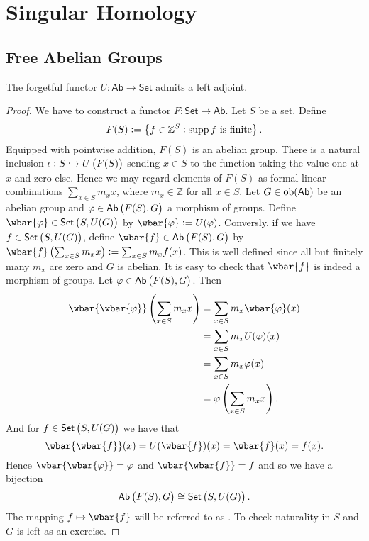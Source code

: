 \chapter{Singular Homology}
\section*{Free Abelian Groups}

\begin{proposition}
	The forgetful functor $U : \mathsf{Ab} \to \mathsf{Set}$ admits a left adjoint.
	\label{prop:free_adj_forget}
\end{proposition}

\begin{proof}
	We have to construct a functor $F : \mathsf{Set} \to \mathsf{Ab}$. Let $S$ be a set. Define 
	\begin{equation*}
		F(S) := \cbr[1]{f \in \mathbb{Z}^S : \supp f \text{ is finite}}.
	\end{equation*}
	Equipped with pointwise addition, $F(S)$ is an abelian group. There is a natural inclusion $\iota : S \hookrightarrow U\del[1]{F(S)}$ sending $x \in S$ to the function taking the value one at $x$ and zero else. Hence we may regard elements of $F(S)$ as formal linear combinations $\sum_{x \in S}m_x x$, where $m_x \in \mathbb{Z}$ for all $x \in S$. Let $G \in \operatorname{ob}(\mathsf{Ab})$ be an abelian group and $\varphi \in \mathsf{Ab}\del[1]{F(S), G}$ a morphism of groups. Define $\wbar{\varphi} \in \mathsf{Set}\del[1]{S,U(G)}$ by $\wbar{\varphi} := U(\varphi)$. Conversly, if we have $f \in \mathsf{Set}\del[1]{S,U(G)}$, define $\wbar{f} \in \mathsf{Ab}\del[1]{F(S),G}$ by $\wbar{f}\del[1]{\sum_{x \in S} m_x x} := \sum_{x \in S} m_x f(x)$. This is well defined since all but finitely many $m_x$ are zero and $G$ is abelian. It is easy to check that $\wbar{f}$ is indeed a morphism of groups. Let $\varphi \in \mathsf{Ab}\del[1]{F(S),G}$. Then
	\begin{align*}
		\wbar{\wbar{\varphi}}\del[4]{\sum_{x \in S} m_x x} &= \sum_{x \in S}m_x \wbar{\varphi}(x)\\
		&= \sum_{x \in S} m_x U(\varphi)(x)\\
		&= \sum_{x \in S} m_x \varphi(x)\\
		&= \varphi \del[4]{\sum_{x \in S} m_x x}.
	\end{align*}
	And for $f \in \mathsf{Set}\del[1]{S,U(G)}$ we have that
	\begin{equation*}
		\wbar{\wbar{f}}(x) = U(\wbar{f})(x) = \wbar{f}(x) = f(x). 
	\end{equation*}
	\noindent Hence $\wbar{\wbar{\varphi}} = \varphi$ and $\wbar{\wbar{f}} = f$ and so we have a bijection
	\begin{equation*}
		\mathsf{Ab}\del[1]{F(S),G} \cong \mathsf{Set}\del[1]{S,U(G)}.
	\end{equation*}
	The mapping $f \mapsto \wbar{f}$ will be referred to as . To check naturality in $S$ and $G$ is left as an exercise.
\end{proof}

